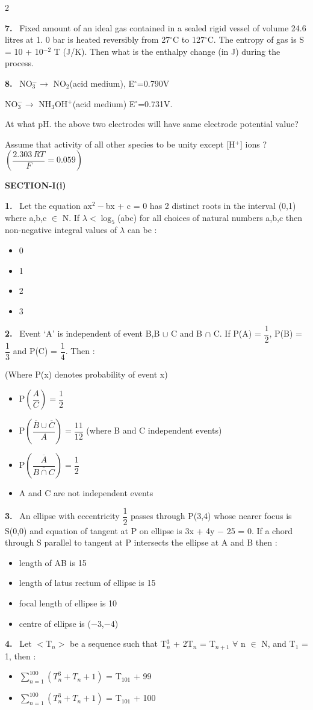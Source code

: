 \documentclass[10pt]{extarticle}
\newcommand{\papersec}[1]{\par\bigskip{\centering\Large\bfseries PAPER-#1\par}\medskip}
\newcommand{\partsec}[2]{\par\medskip\noindent{\large\bfseries PART-#1: #2}\par\smallskip}
\newcommand{\sect}[1]{\par\smallskip\noindent\textbf{#1}\par}
\newcommand{\qn}[1]{\par\smallskip\noindent\textbf{#1.}~}
\newenvironment{qoptions}{\begin{itemize}[leftmargin=1.8em,itemsep=1pt,topsep=2pt,label={}]}{\end{itemize}}
\newcommand{\opt}[2]{\item[(#1)] #2}
\begin{document}
\begin{multicols}{2}
\qn{7} Fixed amount of an ideal gas contained in a sealed rigid vessel of volume 24.6 litres at 1. 0 bar is heated reversibly from 27$^\circ$C to 127$^\circ$C. The entropy of gas is S = 10 + 10$^{-2}$ T (J/K). Then what is the enthalpy change (in J) during the process.
\qn{8} NO$_3^-\to$ NO$_2$(acid medium), E$^\circ$=0.790V\par
NO$_3^-\to$ NH$_3$OH$^+$(acid medium) E$^\circ$=0.731V.\par
At what pH. the above two electrodes will have same electrode potential value?\par
Assume that activity of all other species to be unity except [H$^+$] ions ? $\left(\dfrac{2.303\,RT}{F}=0.059\right)$
\raggedcolumns
\papersec{1}
\partsec{3}{MATHEMATICS}
\sect{SECTION-I(i)}
\qn{1} Let the equation ax$^2-$bx + c = 0 has 2 distinct roots in the interval (0,1) where a,b,c $\in$ N. If $\lambda<\log_5$(abc) for all choices of natural numbers a,b,c then non-negative integral values of $\lambda$ can be :
\begin{qoptions}
\opt{A}{0}
\opt{B}{1}
\opt{C}{2}
\opt{D}{3}
\end{qoptions}
\qn{2} Event `A' is independent of event B,B $\cup$ C and B $\cap$ C. If P(A) = $\dfrac12$, P(B) = $\dfrac13$ and P(C) = $\dfrac14$. Then :\par
(Where P(x) denotes probability of event x)
\begin{qoptions}
\opt{A}{P$\left(\dfrac AC\right)=\dfrac12$}
\opt{B}{P$\left(\dfrac{\overline B\cup\overline C}{A}\right)=\dfrac{11}{12}$ (where B and C independent events)}
\opt{C}{P$\left(\dfrac{\overline A}{\overline{B\cap C}}\right)=\dfrac12$}
\opt{D}{A and C are not independent events}
\end{qoptions}
\qn{3} An ellipse with eccentricity $\dfrac12$ passes through P(3,4) whose nearer focus is S(0,0) and equation of tangent at P on ellipse is 3x + 4y $-$ 25 = 0. If a chord through S parallel to tangent at P intersects the ellipse at A and B then :
\begin{qoptions}
\opt{A}{length of AB is 15}
\opt{B}{length of latus rectum of ellipse is 15}
\opt{C}{focal length of ellipse is 10}
\opt{D}{centre of ellipse is ($-$3,$-$4)}
\end{qoptions}
\qn{4} Let $<$T$_n>$ be a sequence such that T$_n^3$ + 2T$_n$ = T$_{n+1}$ $\forall$ n $\in$ N, and T$_1$ = 1, then :
\begin{qoptions}
\opt{A}{$\displaystyle\sum_{n=1}^{100}\left(T_n^3+T_n+1\right)$ = T$_{101}$ + 99}
\opt{B}{$\displaystyle\sum_{n=1}^{100}\left(T_n^3+T_n+1\right)$ = T$_{101}$ + 100}

\end{qoptions}
\end{multicols}
\end{document}
